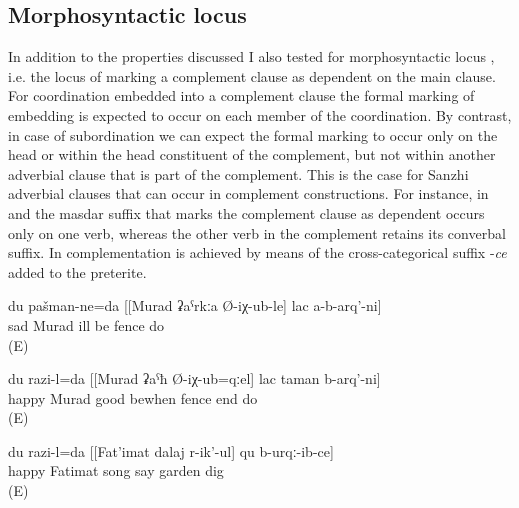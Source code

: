 
\subsection{Morphosyntactic locus}
\label{ssec:Morphosyntactic locus}

In addition to the properties discussed I also tested for morphosyntactic locus \citep{Kazenin.Testelets2004}, i.e. the locus of marking a complement clause as dependent on the main clause. For coordination embedded into a complement clause the formal marking of embedding is expected to occur on each member of the coordination. By contrast, in case of subordination we can expect the formal marking to occur only on the head or within the head constituent of the complement, but not within another adverbial clause that is part of the complement. This is the case for Sanzhi adverbial clauses that can occur in complement constructions. For instance, in  and  the masdar suffix that marks the complement clause as dependent occurs only on one verb, whereas the other verb in the complement retains its converbal suffix. In  complementation is achieved by means of the cross-categorical suffix -\textit{ce} added to the preterite.
%
\begin{exe}
	\ex	\label{ex:‎‎‎I am sad because Murad got ill and did not build the fence4}
	\gll	du	pašman-ne=da [[Murad	ʡaˁrkːa	Ø-iχ-ub-le]	lac	a-b-arq'-ni]\\
			sad	Murad	ill	be	fence	do\\
	\glt	{} (E)

	\ex	\label{ex:‎I am happy when Murad got healthy and finished building the fence5}
	\gll	du	razi-l=da	[[Murad	ʡaˁħ	Ø-iχ-ub=qːel]	lac	taman	b-arq'-ni]\\
			happy	Murad	good	bewhen	fence	end	do\\
	\glt	{} (E)

	\ex	\label{ex:‎I am happy that Fatimat dug the field while singing a song}
	\gll	du	razi-l=da	[[Fat'imat	dalaj	r-ik'-ul]	qu	b-urqː-ib-ce]\\
			happy	Fatimat	song	say	garden	dig\\
	\glt	{} (E)
\end{exe}


